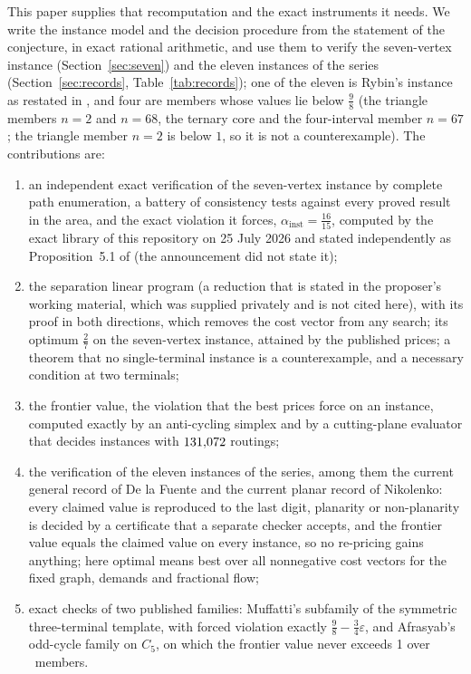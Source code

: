 \documentclass[11pt]{article}
\theoremstyle{remark}
\begin{document}
This paper supplies that recomputation and the exact instruments it needs. We write the instance model
and the decision procedure from the statement of the conjecture, in exact rational arithmetic, and use them
to verify the seven-vertex instance (Section~\ref{sec:seven}) and the eleven instances of the series
(Section~\ref{sec:records}, Table~\ref{tab:records}); one of the eleven is Rybin's instance as restated in \cite{Nik1}, and four are
members whose values lie below $\tfrac98$ (the triangle members $n=2$ and $n=68$, the ternary core and the four-interval member
$n=67$; the triangle member $n=2$ is below $1$, so it is not a counterexample). The contributions are:
\begin{enumerate}
\item an independent exact verification of the seven-vertex instance by complete path enumeration, a battery of
consistency tests against every proved result in the area, and the exact violation it forces,
$\alpha_{\mathrm{inst}}=\tfrac{16}{15}$, computed by the exact library of this repository on 25 July 2026 and stated independently as
Proposition~5.1 of \cite{Nik1} (the announcement did not state it);
\item the separation linear program (a reduction that is stated in the proposer's working material, which was supplied
privately and is not cited here), with its proof in both directions, which removes the cost vector from any
search; its optimum $\tfrac27$ on the seven-vertex instance, attained by the published prices; a theorem that no
single-terminal instance is a counterexample, and a necessary condition at two terminals;
\item the frontier value, the violation that the best prices force on an instance, computed exactly by an
anti-cycling simplex and by a cutting-plane evaluator that decides instances with $131{,}072$ routings;
\item the verification of the eleven instances of the series, among them the current general record of De la Fuente and the
current planar record of Nikolenko: every claimed value is
reproduced to the last digit, planarity or non-planarity is decided by a certificate that a separate checker
accepts, and the frontier value equals the claimed value on every instance, so no re-pricing gains anything; here
optimal means best over all nonnegative cost vectors for the fixed graph, demands and fractional flow;
\item exact checks of two published families: Muffatti's subfamily of the symmetric three-terminal template, with forced violation exactly
$\tfrac98-\tfrac34\varepsilon$, and Afrasyab's odd-cycle family on $C_5$, on which the frontier value never exceeds 1
over \nsixtotal\ members.
\end{enumerate}
\end{document}

